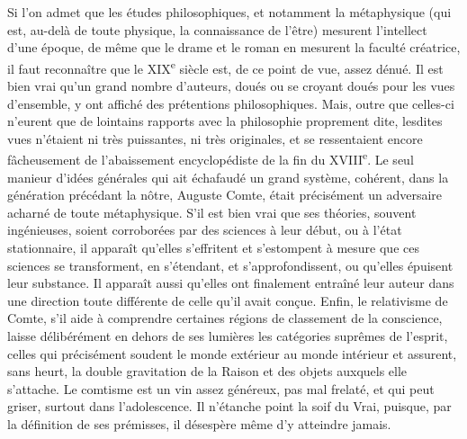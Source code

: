 \documentclass[french,twoside]{book} %
\newcommand\chaptercont{} %
\begin{document}
\chaptercont
\noindent Si l’on admet que les études philosophiques, et notamment la métaphysique (qui est, au-delà de toute physique, la connaissance de l’être) mesurent l’intellect d’une époque, de même que le drame et le roman en mesurent la faculté créatrice, il faut reconnaître que le XIX\textsuperscript{e} siècle est, de ce point de vue, assez dénué. Il est bien vrai qu’un grand nombre d’auteurs, doués ou se croyant doués pour les vues d’ensemble, y ont affiché des prétentions philosophiques. Mais, outre que celles-ci n’eurent que de lointains rapports avec la philosophie proprement dite, lesdites vues n’étaient ni très puissantes, ni très originales, et se ressentaient encore fâcheusement de l’abaissement encyclopédiste de la fin du XVIII\textsuperscript{e}. Le seul manieur d’idées générales qui ait échafaudé un grand système, cohérent, dans la génération précédant la nôtre, Auguste Comte, était précisément un adversaire acharné de toute métaphysique. S’il est bien vrai que ses théories, souvent ingénieuses, soient corroborées par des sciences à leur début, ou à l’état stationnaire, il apparaît qu’elles s’effritent et s’estompent à mesure que ces sciences se transforment, en s’étendant, et s’approfondissent, ou qu’elles épuisent leur substance. Il apparaît aussi qu’elles ont finalement entraîné leur auteur dans une direction toute différente de celle qu’il avait conçue. Enfin, le relativisme de Comte, s’il aide à comprendre certaines régions de classement de la conscience, laisse délibérément en dehors de ses lumières les catégories suprêmes de l’esprit, celles qui précisément soudent le monde extérieur au monde intérieur et assurent, sans heurt, la double gravitation de la Raison et des objets auxquels elle s’attache. Le comtisme est un vin assez généreux, pas mal frelaté, et qui peut griser, surtout dans l’adolescence. Il n’étanche point la soif du Vrai, puisque, par la définition de ses prémisses, il désespère même d’y atteindre jamais.\par
\end{document}
